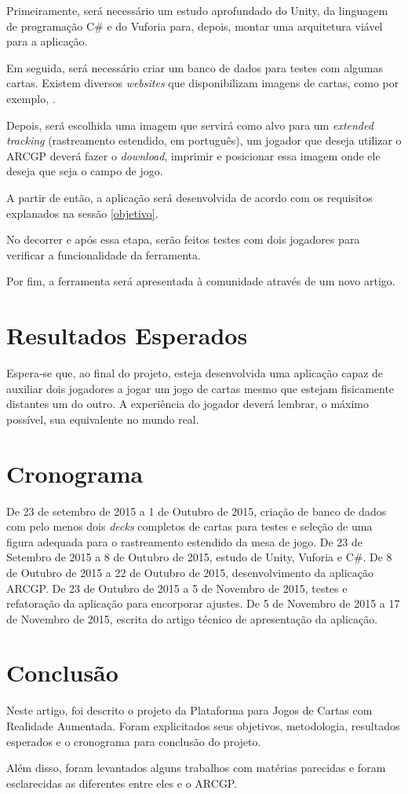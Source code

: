 \documentclass[conference]{IEEEtran}
\begin{document}
Primeiramente, será necessário um estudo aprofundado do Unity, da linguagem de 
programação C\# \cite{csharp} e do Vuforia para, depois, montar uma arquitetura 
viável para a aplicação.

Em seguida, será necessário criar um banco de dados para testes com algumas 
cartas. Existem diversos \textit{websites} que disponibilizam imagens de cartas, 
como por exemplo, \cite{magic_cards}.

Depois, será escolhida uma imagem que servirá como alvo para um \textit{extended 
tracking} (rastreamento estendido, em português), um jogador que deseja utilizar 
o ARCGP deverá fazer o \textit{download}, imprimir e posicionar essa imagem onde 
ele deseja que seja o campo de jogo.

A partir de então, a aplicação será desenvolvida de acordo com os requisitos 
explanados na sessão \ref{objetivo}.

No decorrer e após essa etapa, serão feitos testes com dois jogadores para 
verificar a funcionalidade da ferramenta.

Por fim, a ferramenta será apresentada à comunidade através de um novo artigo.

\section{Resultados Esperados}
\label{resultados_esperados}
Espera-se que, ao final do projeto, esteja desenvolvida uma aplicação capaz de 
auxiliar dois jogadores a jogar um jogo de cartas mesmo que estejam fisicamente 
distantes um do outro. A experiência do jogador deverá lembrar, o máximo 
possível, sua equivalente no mundo real.

\section{Cronograma}
\label{cronograma}
De 23 de setembro de 2015 a 1 de Outubro de 2015, criação de banco de dados 
com pelo menos dois \textit{decks} completos de cartas para testes e seleção de 
uma figura adequada para o rastreamento estendido da mesa de jogo.
De 23 de Setembro de 2015 a 8 de Outubro de 2015, estudo de Unity, Vuforia e 
C\#.
De 8 de Outubro de 2015 a 22 de Outubro de 2015, desenvolvimento da aplicação 
ARCGP.
De 23 de Outubro de 2015 a 5 de Novembro de 2015, testes e refatoração da 
aplicação para encorporar ajustes.
De 5 de Novembro de 2015 a 17 de Novembro de 2015, escrita do artigo técnico de 
apresentação da aplicação.

\section{Conclusão}
\label{conclusao}
Neste artigo, foi descrito o projeto da Plataforma para Jogos de Cartas com 
Realidade Aumentada. Foram explicitados seus objetivos, metodologia, resultados 
esperados e o cronograma para conclusão do projeto.

Além disso, foram levantados alguns trabalhos com matérias parecidas e foram 
esclarecidas as diferentes entre eles e o ARCGP.



\end{document}
